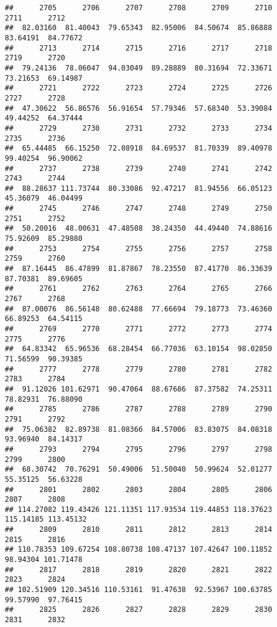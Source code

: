 \documentclass[
]{article}
\begin{document}
\begin{verbatim}
##      2705      2706      2707      2708      2709      2710      2711      2712 
##  82.03160  81.40043  79.65343  82.95006  84.50674  85.86888  83.64191  84.77672 
##      2713      2714      2715      2716      2717      2718      2719      2720 
##  79.24136  78.06047  94.03049  89.28889  80.31694  72.33671  73.21653  69.14987 
##      2721      2722      2723      2724      2725      2726      2727      2728 
##  47.30622  56.86576  56.91654  57.79346  57.68340  53.39084  49.44252  64.37444 
##      2729      2730      2731      2732      2733      2734      2735      2736 
##  65.44485  66.15250  72.08918  84.69537  81.70339  89.40978  99.40254  96.90062 
##      2737      2738      2739      2740      2741      2742      2743      2744 
##  88.28637 111.73744  80.33086  92.47217  81.94556  66.05123  45.36079  46.04499 
##      2745      2746      2747      2748      2749      2750      2751      2752 
##  50.20016  48.00631  47.48508  38.24350  44.49440  74.88616  75.92609  85.29880 
##      2753      2754      2755      2756      2757      2758      2759      2760 
##  87.16445  86.47899  81.87867  78.23550  87.41770  86.33639  87.70381  89.69605 
##      2761      2762      2763      2764      2765      2766      2767      2768 
##  87.00076  86.56148  80.62488  77.66694  79.18773  73.46360  66.89253  64.54115 
##      2769      2770      2771      2772      2773      2774      2775      2776 
##  64.83342  65.96536  68.28454  66.77036  63.10154  98.02850  71.56599  90.39385 
##      2777      2778      2779      2780      2781      2782      2783      2784 
##  91.12026 101.62971  90.47064  88.67686  87.37582  74.25311  78.82931  76.88090 
##      2785      2786      2787      2788      2789      2790      2791      2792 
##  75.06382  82.89738  81.08366  84.57006  83.83075  84.08318  93.96940  84.14317 
##      2793      2794      2795      2796      2797      2798      2799      2800 
##  68.30742  70.76291  50.49006  51.50040  50.99624  52.01277  55.35125  56.63228 
##      2801      2802      2803      2804      2805      2806      2807      2808 
## 114.27082 119.43426 121.11351 117.93534 119.44853 118.37623 115.14185 113.45132 
##      2809      2810      2811      2812      2813      2814      2815      2816 
## 110.78353 109.67254 108.80738 108.47137 107.42647 100.11852  98.94304 101.71478 
##      2817      2818      2819      2820      2821      2822      2823      2824 
## 102.51909 120.34516 110.53161  91.47638  92.53967 100.63785  99.57990  97.76415 
##      2825      2826      2827      2828      2829      2830      2831      2832 

\end{verbatim}
\end{document}
